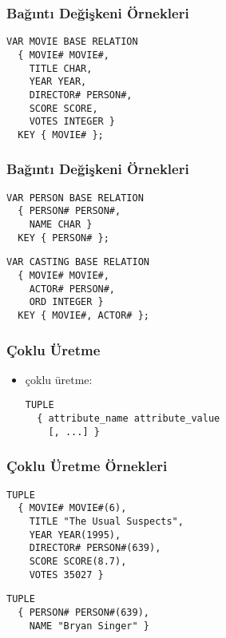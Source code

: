 \documentclass[dvipsnames]{beamer}
\theoremstyle{plain}
\begin{document}
\begin{frame}[fragile]
  \frametitle{Bağıntı Değişkeni Örnekleri}

  \begin{lstlisting}
VAR MOVIE BASE RELATION
  { MOVIE# MOVIE#,
    TITLE CHAR,
    YEAR YEAR,
    DIRECTOR# PERSON#,
    SCORE SCORE,
    VOTES INTEGER }
  KEY { MOVIE# };
  \end{lstlisting}
\end{frame}

\begin{frame}[fragile]
  \frametitle{Bağıntı Değişkeni Örnekleri}

  \begin{lstlisting}
VAR PERSON BASE RELATION
  { PERSON# PERSON#,
    NAME CHAR }
  KEY { PERSON# };
  \end{lstlisting}

  \begin{lstlisting}
VAR CASTING BASE RELATION
  { MOVIE# MOVIE#,
    ACTOR# PERSON#,
    ORD INTEGER }
  KEY { MOVIE#, ACTOR# };
  \end{lstlisting}
\end{frame}

\begin{frame}[fragile]
  \frametitle{Çoklu Üretme}

  \begin{itemize}
    \item çoklu üretme:
    \begin{lstlisting}
TUPLE
  { attribute_name attribute_value
    [, ...] }
    \end{lstlisting}
  \end{itemize}
\end{frame}

\begin{frame}[fragile]
  \frametitle{Çoklu Üretme Örnekleri}

  \begin{lstlisting}
TUPLE
  { MOVIE# MOVIE#(6),
    TITLE "The Usual Suspects",
    YEAR YEAR(1995),
    DIRECTOR# PERSON#(639),
    SCORE SCORE(8.7),
    VOTES 35027 }
  \end{lstlisting}

  \begin{lstlisting}
TUPLE
  { PERSON# PERSON#(639),
    NAME "Bryan Singer" }
  \end{lstlisting}
\end{frame}

%
%
\end{document}
